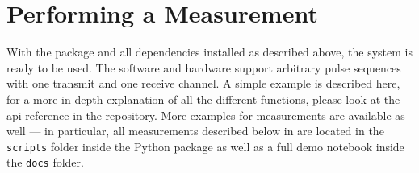 \section{Performing a Measurement}
With the package and all dependencies installed as described above, the system is ready to be used. The software and hardware support arbitrary pulse sequences with one transmit and one receive channel. A simple example is described here, for a more in-depth explanation of all the different functions, please look at the \acrshort{api} reference in the repository. More examples for measurements are available as well --- in particular, all measurements described below in  are located in the \lstinline{scripts} folder inside the Python package as well as a full demo notebook inside the \lstinline{docs} folder.


